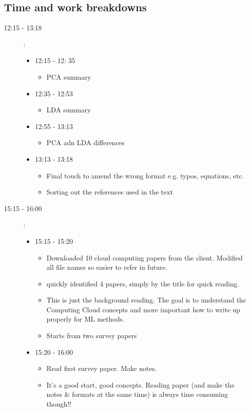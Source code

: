 \documentclass[a4paper]{article}
\begin{document}
\subsection{Time and work breakdowns}
\begin{description}
	\item [12:15 - 13:18]:
	\begin{itemize}
		\item 12:15 - 12: 35
			\begin{itemize}
				\item PCA summary				
			\end{itemize}
		\item 12:35 - 12:53
			\begin{itemize}
				\item LDA summary
			\end{itemize}
		\item 12:55 - 13:13
			\begin{itemize}
				\item PCA adn LDA differences
			\end{itemize}
		\item 13:13 - 13:18
			\begin{itemize}
				\item Final touch to amend the wrong format e.g. typos, equations, etc.
				\item Sorting out the references used in the text
			\end{itemize}
	\end{itemize}
	
	\item[15:15 - 16:00]:
	\begin{itemize}
		\item 15:15 - 15:20
			\begin{itemize}
				\item Downloaded 10 cloud computing papers from the client. Modified all file names so easier to refer in future.
				\item quickly identified 4 papers, simply by the title for quick reading.
				\item This is just the background reading. The goal is to understand the Computing Cloud concepts and more important how to write up properly for ML methods.
				\item Starts from two survey papers
			\end{itemize}
		\item 15:20 - 16:00
		\begin{itemize}
			\item Read first survey paper. Make notes.
			\item It's a good start, good concepts. Reading paper (and make the notes \& formats at the same time) is always time consuming though!!
		\end{itemize} 
		 
	\end{itemize}
\end{description}
\end{document}
